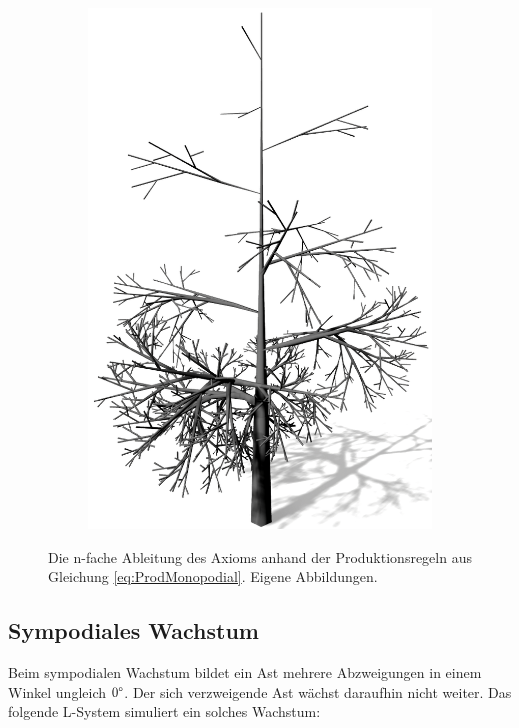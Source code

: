 \begin{figure} [hbtp]
\begin{subfigure}[t]{.45\textwidth}
		\caption{}
		\label{subfig:LS_Monopodial_3}
	\end{subfigure}
	\begin{subfigure}[t]{.45\textwidth}
		\centering
		\includegraphics[width=\linewidth]{images/LS_Monopodial_4.png}
		\caption{}
		\label{subfig:LS_Monopodial_4}
	\end{subfigure}
	\caption{Die n-fache Ableitung des Axioms anhand der Produktionsregeln aus Gleichung \ref{eq:ProdMonopodial}. Eigene Abbildungen.}
	\label{fig:LS_Monopodial}
\end{figure}

\subsection{Sympodiales Wachstum}
Beim sympodialen Wachstum bildet ein Ast mehrere Abzweigungen in einem Winkel ungleich $0\degree$. Der sich verzweigende Ast wächst daraufhin nicht weiter. \cite[S.21]{Forstbonatik:17} \cite[S.58]{ABOP:04} Das folgende L-System simuliert ein solches Wachstum:

